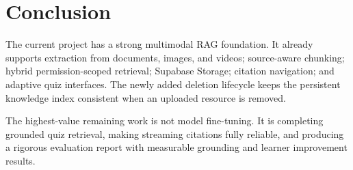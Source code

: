 \documentclass[11pt,a4paper]{article}
\begin{document}
\section{Conclusion}

The current project has a strong multimodal RAG foundation. It already
supports extraction from documents, images, and videos; source-aware
chunking; hybrid permission-scoped retrieval; Supabase Storage; citation
navigation; and adaptive quiz interfaces. The newly added deletion lifecycle
keeps the persistent knowledge index consistent when an uploaded resource is
removed.

The highest-value remaining work is not model fine-tuning. It is completing
grounded quiz retrieval, making streaming citations fully reliable, and
producing a rigorous evaluation report with measurable grounding and learner
improvement results.
\end{document}
